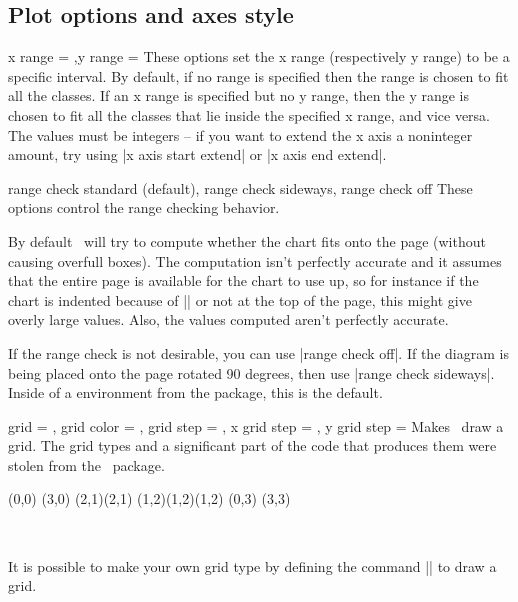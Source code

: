 \begin{sseqdata}[name = basic, cohomological Serre grading]
\subsection{Plot options and axes style}
\begin{keylist}{x range = ,y range = } These options set the x range (respectively y range) to be a specific
interval. By default, if no range is specified then the range is chosen to fit
all the classes. If an x range is specified but no y range, then the y range is
chosen to fit all the classes that lie inside the specified x range, and vice
versa. The values must be integers -- if you want to extend the x axis a
noninteger amount, try using |x axis start extend| or |x axis end extend|.
\end{keylist}

\begin{keylist}{range check standard (default), range check sideways, range check off}
These options control the range checking behavior.

By default \sseqpages\ will try to compute whether the chart fits onto the page
(without causing overfull boxes). The computation isn't perfectly accurate and
it assumes that the entire page is available for the chart to use up, so for
instance if the chart is indented because of |\textindent| or not at the top of
the page, this might give overly large values. Also, the values computed aren't
perfectly accurate.

If the range check is not desirable, you can use |range check off|. If the
diagram is being placed onto the page rotated 90 degrees, then use
%
|range check sideways|. Inside of a  environment from the
 package, this is the default.
\end{keylist}

\begin{keylist}{
    grid = ,
    grid color = ,
    grid step = ,
    x grid step = ,
    y grid step = 
}%
Makes \sseqpages\  draw a grid. The grid types and a significant part of the
code that produces them were stolen from the \sseqpkg\ package.
\begin{codeexample}[vbox]
\begin{sseqdata}[ name = grid example, scale = 0.8 ]
\class(0,0)
\class(3,0)
\class(2,1)\class(2,1)
\class(1,2)\class(1,2)\class(1,2)
\class(0,3)
\class(3,3)
\end{sseqdata}
\hbox{
\printpage[ name = grid example, grid = chess, title=chess ]
\qquad
\printpage[ name = grid example, grid = crossword, title=crossword ]
}
\vskip20pt
\hbox{
\printpage[ name = grid example, grid = go, title=go ]
\qquad
\printpage[ name = grid example, grid = none ]
}
\end{codeexample}
It is possible to make your own grid type by defining the command
|\sseq@grid@yourgridname| to draw a grid.


\end{keylist}
\end{sseqdata}
